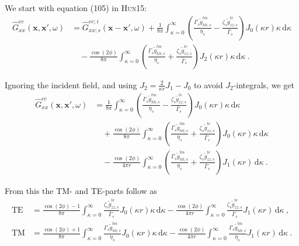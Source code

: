 \documentclass[fontsize=9pt, parskip=half, notitlepage, fleqn]{scrartcl}
\newcommand{\hun}{\textsc{Hun15}\xspace}
\newcommand{\mr}[1]{\mathrm{#1}}
\begin{document}
We start with equation (105) in \hun:
%
\begin{align}
  \hat{G}^{ee}_{xx}(\boldsymbol{x}, \boldsymbol{x'}, \omega)& =
  \hat{G}^{ee;i}_{xx;s}(\boldsymbol{x}-\boldsymbol{x'}, \omega)
  + \frac{1}{8\pi}\int^\infty_{\kappa=0}
  \left(\frac{\Gamma_s \tilde{g}^{tm}_{hh;s}}{\eta_s}-
  \frac{\zeta_s \tilde{g}^{te}_{zz;s}}{\bar{\Gamma}_s}\right)
  J_0(\kappa r)\kappa\,\mr{d}\kappa \nonumber\\
  &\quad - \frac{\cos(2\phi)}{8\pi}\int^\infty_{\kappa=0}
  \left(\frac{\Gamma_s \tilde{g}^{tm}_{hh;s}}{\eta_s} +
  \frac{\zeta_s \tilde{g}^{te}_{zz;s}}{\bar{\Gamma}_s}\right)
  J_2(\kappa r)\kappa\,\mr{d}\kappa \ .
\end{align}
%

Ignoring the incident field, and using $J_2 = \frac{2}{\kappa r}J_1 - J_0$ to
avoid $J_2$-integrals, we get
%
\begin{align}
  \hat{G}^{ee}_{xx}(\boldsymbol{x}, \boldsymbol{x'}, \omega)& =
  \frac{1}{8\pi}\int^\infty_{\kappa=0}
  \left(\frac{\Gamma_s \tilde{g}^{tm}_{hh;s}}{\eta_s}-
  \frac{\zeta_s \tilde{g}^{te}_{zz;s}}{\bar{\Gamma}_s}\right)
  J_0(\kappa r)\kappa\,\mr{d}\kappa \nonumber\\
  &\quad + \frac{\cos(2\phi)}{8\pi}\int^\infty_{\kappa=0}
  \left(\frac{\Gamma_s \tilde{g}^{tm}_{hh;s}}{\eta_s} +
  \frac{\zeta_s \tilde{g}^{te}_{zz;s}}{\bar{\Gamma}_s}\right)
  J_0(\kappa r)\kappa\,\mr{d}\kappa \nonumber\\
  &\quad - \frac{\cos(2\phi)}{4\pi r}\int^\infty_{\kappa=0}
  \left(\frac{\Gamma_s \tilde{g}^{tm}_{hh;s}}{\eta_s} +
  \frac{\zeta_s \tilde{g}^{te}_{zz;s}}{\bar{\Gamma}_s}\right)
  J_1(\kappa r)\,\mr{d}\kappa \ .
\end{align}
%

From this the TM- and TE-parts follow as
%
\begin{align}
  \mr{TE}& = \frac{\cos(2\phi)-1}{8\pi}\int^\infty_{\kappa=0}
  \frac{\zeta_s \tilde{g}^{te}_{zz;s}}{\bar{\Gamma}_s}
  J_0(\kappa r)\kappa\,\mr{d}\kappa 
   - \frac{\cos(2\phi)}{4\pi r}\int^\infty_{\kappa=0}
  \frac{\zeta_s \tilde{g}^{te}_{zz;s}}{\bar{\Gamma}_s}
  J_1(\kappa r)\,\mr{d}\kappa \ , \\
  \mr{TM}& = \frac{\cos(2\phi)+1}{8\pi}\int^\infty_{\kappa=0}
  \frac{\Gamma_s \tilde{g}^{tm}_{hh;s}}{\eta_s}
  J_0(\kappa r)\kappa\,\mr{d}\kappa
  - \frac{\cos(2\phi)}{4\pi r}\int^\infty_{\kappa=0}
  \frac{\Gamma_s \tilde{g}^{tm}_{hh;s}}{\eta_s}
  J_1(\kappa r)\,\mr{d}\kappa \ .
\end{align}
%
\end{document}
